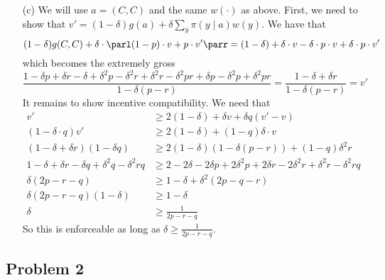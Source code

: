 \documentclass[10pt]{article}
\begin{document}
\begin{itemize}
	\item[(c)] We will use $a = (C,C)$ and the same $w(\cdot)$ as above. First, we need to show that $v' = (1-\delta) g(a) + \delta \sum_y \pi(y \mid a) w(y)$. We have that\[(1-\delta)g(C,C) + \delta \cdot \parl (1-p) \cdot v + p \cdot v'\parr = (1-\delta) + \delta \cdot v -  \delta \cdot p\cdot v + \delta \cdot p \cdot v'\]which becomes the extremely gross\[\frac{1 - \delta p + \delta r - \delta + \delta^2 p - \delta^2 r + \delta^2 r - \delta^2 p r + \delta p - \delta^2 p + \delta^2 pr }{1 - \delta(p-r)} = \frac{1-\delta + \delta r}{1-\delta(p-r)} = v'\] It remains to show incentive compatibility. We need that \begin{align*} v' &\ge 2(1-\delta) + \delta v + \delta q (v'-v) \\ (1 - \delta \cdot q) v' &\ge 2(1-\delta) + (1-q)\delta \cdot v \\ (1-\delta + \delta r)(1-\delta q) &\ge 2(1-\delta)(1-\delta(p-r)) + (1-q)\delta^2r \\ 1 - \delta + \delta r - \delta q + \delta^2 q - \delta^2rq &\ge 2 - 2\delta - 2\delta p+2\delta^2 p + 2\delta r - 2\delta^2r + \delta^2r - \delta^2rq \\ \delta(2p - r -  q) &\ge 1 - \delta + \delta^2(2p - q - r) \\ \delta (2p - r - q) (1-\delta) &\ge 1 - \delta \\ \delta &\ge \frac{1}{2p-r-q} \end{align*} So this is enforceable as long as $\delta \ge \frac{1}{2p-r-q}$.
\end{itemize} 

\subsection*{Problem 2}
\end{document}
